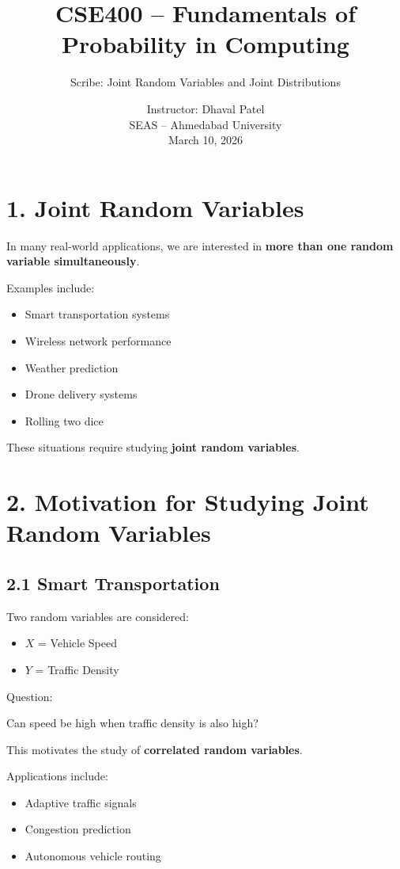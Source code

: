 \documentclass{article}
\title{CSE400 -- Fundamentals of Probability in Computing}
\author{Scribe: Joint Random Variables and Joint Distributions}
\date{Instructor: Dhaval Patel \\ SEAS -- Ahmedabad University \\ March 10, 2026}
\begin{document}
\maketitle

\section*{1. Joint Random Variables}

In many real-world applications, we are interested in \textbf{more than one random variable simultaneously}.

Examples include:

\begin{itemize}
\item Smart transportation systems
\item Wireless network performance
\item Weather prediction
\item Drone delivery systems
\item Rolling two dice
\end{itemize}

These situations require studying \textbf{joint random variables}.

\section*{2. Motivation for Studying Joint Random Variables}

\subsection*{2.1 Smart Transportation}

Two random variables are considered:

\begin{itemize}
\item $X$ = Vehicle Speed
\item $Y$ = Traffic Density
\end{itemize}

Question:

Can speed be high when traffic density is also high?

This motivates the study of \textbf{correlated random variables}.

Applications include:

\begin{itemize}
\item Adaptive traffic signals
\item Congestion prediction
\item Autonomous vehicle routing
\end{itemize}
\end{document}
